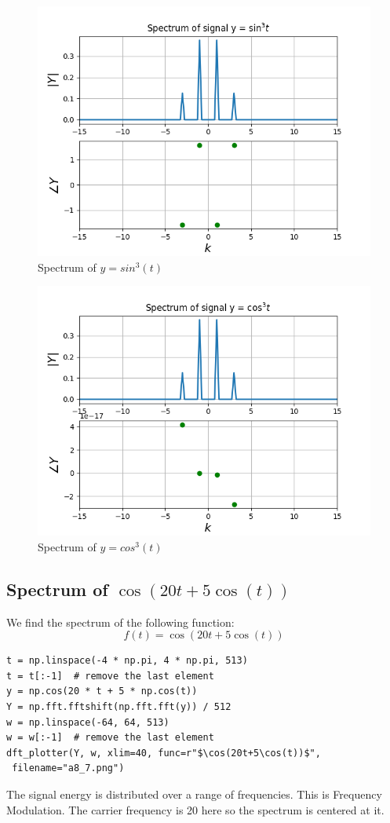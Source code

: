 \documentclass[11pt, a4paper]{article}
\begin{document}
\begin{figure}[!tbh]
   	\centering
  \includegraphics[scale=0.5]{a8_5.png} 
    \caption{Spectrum of $y=sin^3(t)$} 	
   \end{figure} 
   
   \begin{figure}[!tbh]
   	\centering
  \includegraphics[scale=0.5]{a8_6.png} 
    \caption{Spectrum of $y=cos^3(t)$} 	
   \end{figure} 
   
\subsection{Spectrum of $\cos(20t+5\cos(t))$}
We find the spectrum of the following function:
\[f(t) = \cos(20t + 5\cos(t))\]
\begin{verbatim}
t = np.linspace(-4 * np.pi, 4 * np.pi, 513)
t = t[:-1]  # remove the last element
y = np.cos(20 * t + 5 * np.cos(t))
Y = np.fft.fftshift(np.fft.fft(y)) / 512
w = np.linspace(-64, 64, 513)
w = w[:-1]  # remove the last element
dft_plotter(Y, w, xlim=40, func=r"$\cos(20t+5\cos(t))$",
 filename="a8_7.png")
\end{verbatim}
The signal energy is distributed over a range of frequencies. This is Frequency Modulation. The carrier frequency is 20 here so the spectrum is centered at it. 
\end{document}

